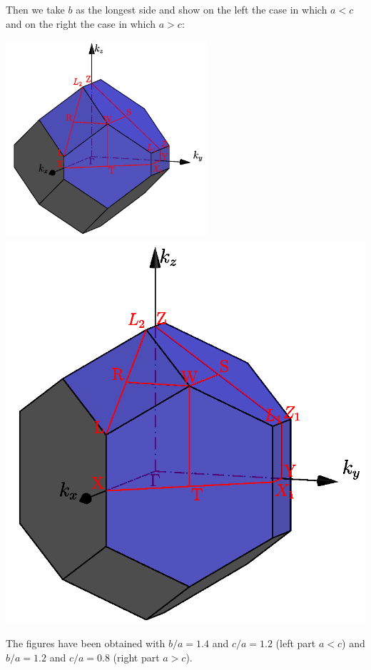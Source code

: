 \documentclass[12pt,a4paper]{article}
\begin{document}
Then we take $b$ as the longest side and show on the left the case 
in which $a<c$ and on the right the case in which $a>c$:
\begin{center}
\includegraphics[width=7.5cm,angle=0]{images/bco_2.png}\hspace{1cm}
\includegraphics[width=7.cm,angle=0]{images/bco_3.png}
\end{center}
The figures have been obtained with $b/a=1.4$ and $c/a=1.2$ (left part $a<c$)
and $b/a=1.2$ and $c/a=0.8$ (right part $a>c$).
\end{document}

